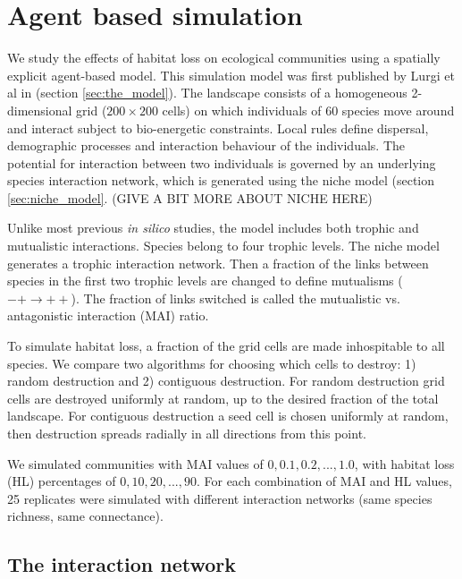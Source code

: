 \section{Agent based simulation}
\label{sec:method}


We study the effects of habitat loss on ecological communities using a spatially explicit agent-based model. This simulation model was first published by Lurgi et al in \cite{lurgi2015effects} (section \ref{sec:the_model}). The landscape consists of a homogeneous 2-dimensional grid ($200 \times 200$ cells) on which individuals of $60$ species move around and interact subject to bio-energetic constraints. Local rules define dispersal, demographic processes and interaction behaviour of the individuals. The potential for interaction between two individuals is governed by an underlying species interaction network, which is generated using the niche model \cite{williams2000simple} (section \ref{sec:niche_model}.  (GIVE A BIT MORE ABOUT NICHE HERE)   

Unlike most previous \emph{in silico} studies, the model includes both trophic and mutualistic interactions. Species belong to four trophic levels. The niche model generates a trophic interaction network. Then a fraction of the links between species in the first two trophic levels are changed to define mutualisms ($-+ \rightarrow ++$). The fraction of links switched is called the mutualistic vs. antagonistic interaction (MAI) ratio.  

To simulate habitat loss, a fraction of the grid cells are made inhospitable to all species. We compare two algorithms for choosing which cells to destroy: 1) random destruction and 2) contiguous destruction. For random destruction grid cells are destroyed uniformly at random, up to the desired fraction of the total landscape. For contiguous destruction a seed cell is chosen uniformly at random, then destruction spreads radially in all directions from this point.  

We simulated communities with MAI values of $0, 0.1, 0.2,..., 1.0$, with habitat loss (HL) percentages of $0, 10, 20, ...,90$. For each combination of MAI and HL values, 25 replicates were simulated with different interaction networks (same species richness, same connectance).


\subsection{The interaction network}
\label{sec:interaction_network}


